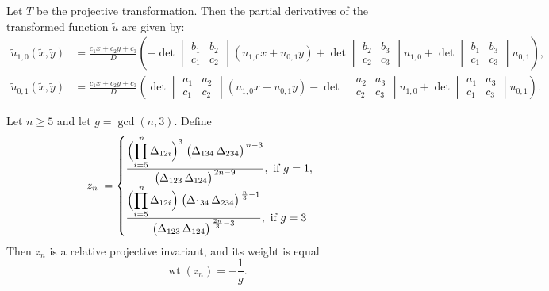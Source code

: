\documentclass[10pt,a4paper]{amsart}
\begin{document}
\begin{theorem}\label{thm:first-prol}
Let $T$ be the projective transformation. Then the partial derivatives of the transformed function $\tilde u$ are given by:
\begin{align*}
\tilde u_{1,0}(\tilde x, \tilde y) &=
\frac{c_1 x + c_2 y + c_3}{D} \left(
  -\det\begin{vmatrix} b_1 & b_2 \\ c_1 & c_2 \end{vmatrix} (u_{1,0} x + u_{0,1} y)
  +\det\begin{vmatrix} b_2 & b_3 \\ c_2 & c_3 \end{vmatrix} u_{1,0}
  +\det\begin{vmatrix} b_1 & b_3 \\ c_1 & c_3 \end{vmatrix} u_{0,1}
\right), %
\\[4pt]
\tilde u_{0,1}(\tilde x, \tilde y) &=
\frac{c_1 x + c_2 y + c_3}{D} \left(
  \det\begin{vmatrix} a_1 & a_2 \\ c_1 & c_2 \end{vmatrix} (u_{1,0} x + u_{0,1} y)
  -\det\begin{vmatrix} a_2 & a_3 \\ c_2 & c_3 \end{vmatrix} u_{1,0}
  +\det\begin{vmatrix} a_1 & a_3 \\ c_1 & c_3 \end{vmatrix} u_{0,1}
\right).%
\end{align*}
\end{theorem}

\begin{theorem}
\label{thm:zn-general}
Let $n\ge5$ and let  $g=\gcd(n,3)$.  
Define
$$
z_n\;=\begin{cases}
\frac{\displaystyle
      \Bigl(\prod_{i=5}^{\,n} \Delta_{12i}\Bigr)^{3}\;
      \bigl(\Delta_{134}\,\Delta_{234}\bigr)^{\,n-3}}
     {\displaystyle
      \bigl(\Delta_{123}\,\Delta_{124}\bigr)^{\,2n-9}}, \text{ if  } g=1,\\
			\frac{\displaystyle
      \Bigl(\prod_{i=5}^{\,n} \Delta_{12i}\Bigr)\;
      \bigl(\Delta_{134}\,\Delta_{234}\bigr)^{\,\frac{n}{3}-1}}
     {\displaystyle
      \bigl(\Delta_{123}\,\Delta_{124}\bigr)^{\,\frac{2n}{3}-3}},   \text{  if  } g=3\\
			\end{cases}
$$
Then \( z_n \) is a relative projective invariant, and its weight is equal
$$
\operatorname{wt}(z_n)=-\frac{1}{g}.
$$
\end{theorem}
\end{document}
